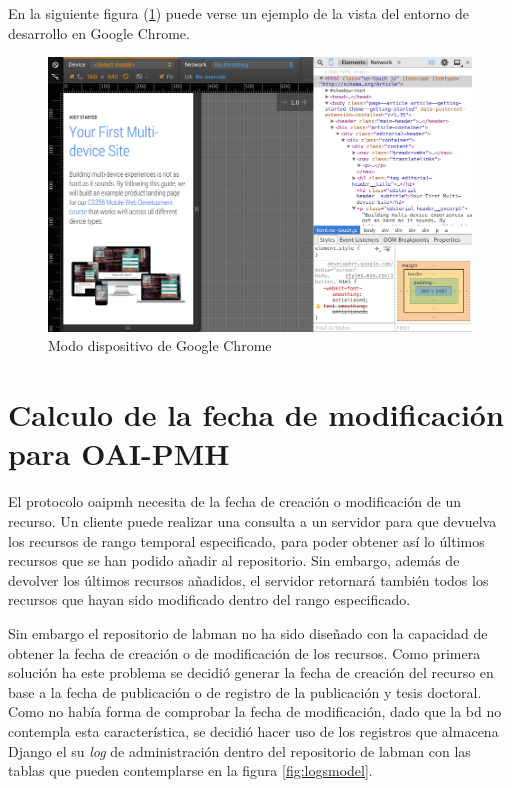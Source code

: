 En la siguiente figura (\ref{fig:google_device}) puede verse un ejemplo de la vista del entorno de desarrollo en Google Chrome.

\begin{figure}[!htp]
	 \centering
	 \includegraphics[scale=0.44]{fig/device_mode}
	 \caption{Modo dispositivo de Google Chrome}
	 \label{fig:google_device}
\end{figure}

\section{Calculo de la fecha de modificación para OAI-PMH}

El protocolo \acrshort{oaipmh} necesita de la fecha de creación o modificación de un recurso. Un cliente puede realizar una consulta a un servidor para que devuelva los recursos de rango temporal especificado, para poder obtener así lo últimos recursos que se han podido añadir al repositorio. Sin embargo, además de devolver los últimos recursos añadidos, el servidor retornará también todos los recursos que hayan sido modificado dentro del rango especificado.

Sin embargo el repositorio de \acrshort{labman} no ha sido diseñado con la capacidad de obtener la fecha de creación o de modificación de los recursos. Como primera solución ha este problema se decidió generar la fecha de creación del recurso en base a la fecha de publicación o de registro de la publicación y tesis doctoral. Como no había forma de comprobar la fecha de modificación, dado que la \acrshort{bd} no contempla esta característica, se decidió hacer uso de los registros que almacena Django el su \textit{log} de administración dentro del repositorio de \acrshort{labman} con las tablas que pueden contemplarse en la figura \ref{fig:logsmodel}.

